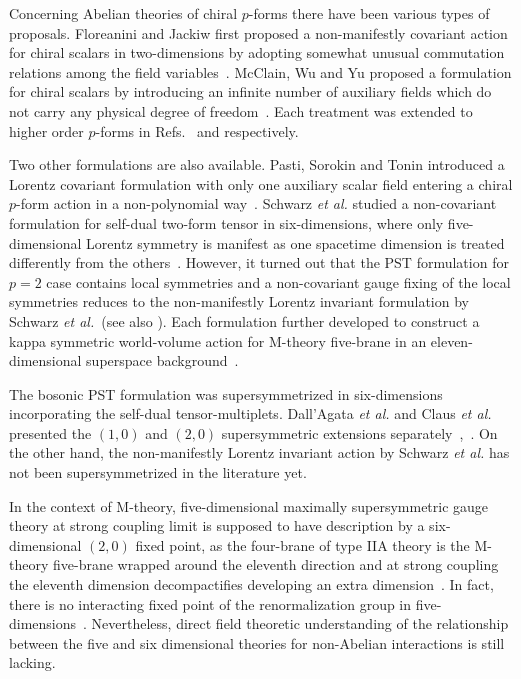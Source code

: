 \documentclass[a4paper,12pt]{article}
\begin{document}
\indent Concerning Abelian theories of chiral $p$-forms there have been various types of proposals.  Floreanini and Jackiw first proposed a non-manifestly covariant action for chiral scalars in two-dimensions by adopting somewhat unusual commutation relations  among the field variables~\cite{PRL591873}.   McClain, Wu and Yu proposed a formulation for chiral scalars  by  introducing an infinite number of auxiliary   fields which do not carry any physical degree of freedom~\cite{NPB343689}.  Each treatment was extended to higher order $p$-forms in Refs.~\cite{PLB206650} and \cite{9603031,9609102} respectively.       \newline


\indent Two other  formulations are also available. Pasti, Sorokin and Tonin introduced a Lorentz covariant formulation  with only one auxiliary scalar field entering a chiral $p$-form action in a non-polynomial way~\cite{9611100}.  Schwarz \textit{et al.} studied a non-covariant formulation for self-dual two-form tensor in six-dimensions, where only five-dimensional Lorentz symmetry is manifest as one spacetime dimension is treated differently from the others~\cite{9304154,9611065,9701008}. However, it turned out  that the PST formulation for $p=2$ case contains local symmetries  and a non-covariant gauge fixing of the local symmetries reduces to the non-manifestly Lorentz invariant  formulation by Schwarz \textit{et al.}~\cite{9701037,9701166}(see also \cite{9503182,9506109,9509052}).  Each formulation further developed  to construct a kappa symmetric  world-volume action for M-theory five-brane in an eleven-dimensional  superspace background~\cite{9701149,9701166}.  \newline



\indent The bosonic PST formulation was  supersymmetrized in six-dimensions incorporating the self-dual  tensor-multiplets.  Dall'Agata \textit{et al.} and Claus \textit{et al.} presented  the $(1,0)$ and $(2,0)$  supersymmetric extensions separately~\cite{9710127},~\cite{9711161}. On the other hand,  the  non-manifestly Lorentz invariant action by Schwarz \textit{et al.} has not been supersymmetrized in the literature yet.  \newline






\indent In the context of M-theory, five-dimensional maximally   supersymmetric  gauge theory at strong coupling limit is supposed to have description by a six-dimensional $(2,0)$ fixed point, as the four-brane of type IIA theory is the M-theory five-brane wrapped around the eleventh direction and at strong coupling the eleventh dimension decompactifies developing an extra dimension~\cite{9702136,9704089}.  In fact, there is no interacting   fixed point of the renormalization group in five-dimensions~\cite{seiberg16}.  Nevertheless, direct  field theoretic understanding of the relationship between the five and six dimensional theories for non-Abelian interactions  is still lacking.   \newline
\end{document}
